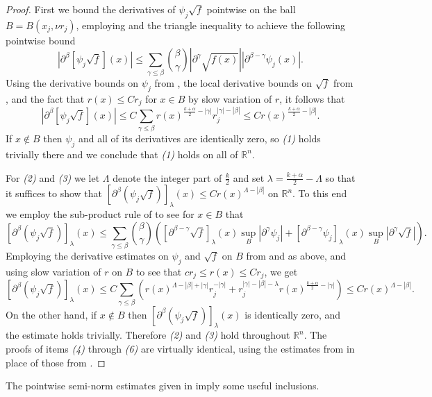 \documentclass[oneside,hidelinks,indentfirst,10pt]{book}
\begin{document}
\begin{proof}
First we bound the derivatives of \(\psi_j\sqrt{f}\) pointwise on the ball \(B=B(x_j,\nu r_j)\), employing  and the triangle inequality to achieve the following pointwise bound
\[
    |\partial^\beta[\psi_j\sqrt{f}](x)|\leq \sum_{\gamma\leq\beta}\binom{\beta}{\gamma}|\partial
    ^\gamma \sqrt{f(x)}||\partial^{\beta-\gamma}\psi_j(x)|.
\]
Using the derivative bounds on \(\psi_j\) from , the local derivative bounds on \(\sqrt{f}\) from , and the fact that \(r(x)\leq Cr_j\) for \(x\in B\) by slow variation of \(r\), it follows that
\[
    |\partial^\beta[\psi_j\sqrt{f}](x)|\leq C\sum_{\gamma\leq\beta}r(x)^{\frac{k+\alpha}{2}-|\gamma|}r_j^{|\gamma|-|\beta|}\leq Cr(x)^{\frac{k+\alpha}{2}-|\beta|}.
\]
If \(x\not\in B\) then \(\psi_j\) and all of its derivatives are identically zero, so \textit{(1)} holds trivially there and we conclude that \textit{(1)} holds on all of \(\mathbb{R}^n\).


For \textit{(2)} and \textit{(3)} we let \(\Lambda\) denote the integer part of \(\frac{k}{2}\) and set \(\lambda=\frac{k+\alpha}{2}-\Lambda\) so that it suffices to show that \([\partial^\beta(\psi_j\sqrt{f})]_\lambda(x)\leq Cr(x)^{\Lambda-|\beta|}\) on \(\mathbb{R}^n\). To this end we employ the sub-product rule of  to see for \(x\in B\) that
\[
    [\partial^\beta(\psi_j\sqrt{f})]_\lambda(x)\leq \sum_{\gamma\leq\beta}\binom{\beta}{\gamma}([\partial^{\beta-\gamma}\sqrt{f}]_{\lambda}(x)\sup_{B}|\partial^\gamma \psi_j|+[\partial^{\beta-\gamma}\psi_j]_\lambda(x)\sup_{B}|\partial^\gamma \sqrt{f}|).
\]
Employing the derivative estimates on \(\psi_j\) and \(\sqrt{f}\) on \(B\) from  and  as above, and using slow variation of \(r\) on \(B\) to see that \(cr_j\leq r(x)\leq Cr_j\), we get
\[
    [\partial^\beta(\psi_j\sqrt{f})]_\lambda(x)\leq C\sum_{\gamma\leq\beta}(r(x)^{\Lambda-|\beta|+|\gamma|}r_j^{-|\gamma|}+r_j^{|\gamma|-|\beta|-\lambda}r(x)^{\frac{k+\alpha}{2}-|\gamma|})\leq Cr(x)^{\Lambda-|\beta|}.
\]
On the other hand, if \(x\not\in B\) then \([\partial^\beta(\psi_j\sqrt{f})]_\lambda(x)\) is identically zero, and the estimate holds trivially. Therefore \textit{(2)} and \textit{(3)} hold throughout \(\mathbb{R}^n\). The proofs of items \textit{(4)} through \textit{(6)} are virtually identical, using the estimates from  in place of those from .
\end{proof}


The pointwise semi-norm estimates given in  imply some useful inclusions.
\end{document}
